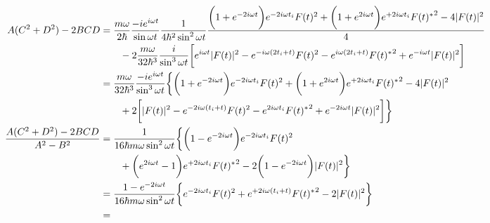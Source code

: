 \begin{align}
    A (C^2 + D^2) - 2 BCD
    &=
    \dfrac{m \omega}{2 \hbar}
    \dfrac{- i e^{i \omega t} }{\sin \omega t}
    \dfrac{1}{4 \hbar^2 \sin^2 \omega t}
    \dfrac{
        \bigg(
            1
        +
            e^{- 2 i \omega t}
        \bigg) 
        e^{- 2 i \omega t_i}
        F(t)^2
    +
        \bigg(
            1
        +
            e^{2 i \omega t}
        \bigg) 
        e^{+ 2 i \omega t_i} {F(t)^*}^2
    -
        4 | F(t) |^2
    }{4}
\notag\\&\qquad
    - 2
    \dfrac{m \omega}{32 \hbar^3}
    \dfrac{ i }{\sin^3 \omega t}
    \bigg[
        e^{i \omega t}
        | F(t) |^2
    -
        e^{- i \omega (2 t_i + t)} F(t)^2
    -
        e^{i \omega (2 t_i + t)} {F(t)^*}^2
    +
        e^{- i \omega t}
        | F(t) |^2
    \bigg]
\notag\\&
    =
    \dfrac{m \omega}{32 \hbar^3}
    \dfrac{ - i e^{i \omega t} }{\sin^3 \omega t}
    \bigg\{
        \bigg(
            1
        +
            e^{- 2 i \omega t}
        \bigg)
        e^{- 2 i \omega t_i}
        F(t)^2
    +
        \bigg(
            1
        +
            e^{2 i \omega t}
        \bigg) 
        e^{+ 2 i \omega t_i} {F(t)^*}^2
    -
        4 | F(t) |^2
    \notag\\&\qquad
    + 2
        \bigg[
            | F(t) |^2
        -
            e^{- 2 i \omega (t_i + t)} F(t)^2
        -
            e^{2 i \omega t_i} {F(t)^*}^2
        +
            e^{- 2 i \omega t}
            | F(t) |^2
        \bigg]
    \bigg\}
\notag\\
    \dfrac{
        A ( C^2 + D^2 )
    -
        2 BCD
    }{
        A^2 - B^2
    }
    &=
    \dfrac{1}{16 \hbar m \omega \sin^2 \omega t}
    \bigg\{
        \bigg(
            1
    -
            e^{- 2 i \omega t}
        \bigg)
        e^{- 2 i \omega t_i}
        F(t)^2
\notag\\&\qquad
    +
        \bigg(
            e^{2 i \omega t}
        -
            1
        \bigg) 
        e^{+ 2 i \omega t_i} {F(t)^*}^2
    - 2
        \bigg(
            1
        -
            e^{- 2 i \omega t}
        \bigg)
        | F(t) |^2
    \bigg\}
\notag\\&
    =
    \dfrac{
            1
        -
            e^{- 2 i \omega t}
    }{16 \hbar m \omega \sin^2 \omega t}
    \bigg\{
        e^{- 2 i \omega t_i}
        F(t)^2
    +
        e^{+ 2 i \omega (t_i + t)} {F(t)^*}^2
    - 2
        | F(t) |^2
    \bigg\}
\notag\\&
    =

\end{align}
